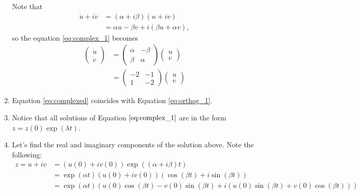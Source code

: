 \documentclass[12pt,letterpaper]{article}
\begin{document}
\begin{enumerate}[label=(\alph*)]
	      Note that
	      \begin{align}
		      \dot{u} + i \dot{v} & = (\alpha + i \beta) (u + i v)                 \\
		                          & = \alpha u - \beta v + i (\beta u + \alpha v),
	      \end{align} so the equation \ref{eq:complex_1} becomes
	      \begin{align}
		      \begin{pmatrix}
			      \dot{u} \\
			      \dot{v}
		      \end{pmatrix} & = \begin{pmatrix}
			      \alpha & -\beta \\
			      \beta  & \alpha
		      \end{pmatrix} \begin{pmatrix}
			      u \\
			      v
		      \end{pmatrix} \\
		                                 & =
		      \begin{pmatrix}
			      -2 & -1 \\
			      1  & -2
		      \end{pmatrix} \begin{pmatrix}
			      u \\
			      v
		      \end{pmatrix} \label{eq:complexed}
	      \end{align}

	\item Equation \ref{eq:complexed} coincides with Equation \ref{eq:orthog_1}.
	\item Notice that all solutions of Equation $\ref{eq:complex_1}$ are in the form $z = z(0) \exp(\lambda t)$.
	\item Let's find the real and imaginary components of the solution above. Note the following:
	      \begin{align}
		      z = u +  i v & = (u(0)  + i v(0)) \exp((\alpha + i \beta)t)                                                        \\
		                   & =\exp(\alpha t)(u(0)  + i v(0))(\cos(\beta t) + i \sin(\beta t))                                    \\
		                   & = \exp(\alpha t)(u(0)\cos(\beta t) - v(0)\sin(\beta t) + i (u(0)\sin(\beta t) + v(0)\cos(\beta t)))
	      \end{align}


\end{enumerate}
\end{document}
